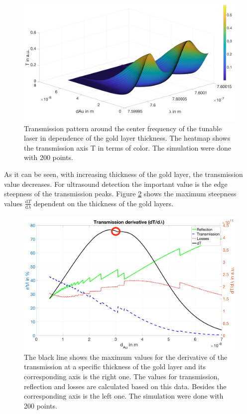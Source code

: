 \begin{figure}[H]
	\centering
	\includegraphics[height=0.47\textheight,width=\textwidth]{05_OUSD/images/transmission3D.png}
	\caption{Transmission pattern around the center frequency of the tunable laser in dependence of the gold layer thickness. The heatmap shows the transmission axis T in terms of color. The simulation were done with 200 points.}
	\label{fig:transmission3D}
\end{figure} 

As it can be seen, with increasing thickness of the gold layer, the transmission value decreases. For ultrasound detection the important value is the edge steepness of the transmission peaks. Figure \ref{fig:transDerivative} shows the maximum steepness values $\frac{\mathrm{d}T}{\mathrm{d}\lambda}$ dependent on the thickness of the gold layers.

\begin{figure}[H]
	\centering
	\includegraphics[height=0.56\textheight,width=1.1\textwidth]{05_OUSD/images/transDerivative.png}
	\caption{The black line shows the maximum values for the derivative of the transmission at a specific thickness of the gold layer and its corresponding axis is the right one. The values for transmission, reflection and losses are calculated based on this data. Besides the corresponding axis is the left one. The simulation were done with 200 points.}
	\label{fig:transDerivative}
\end{figure} 

